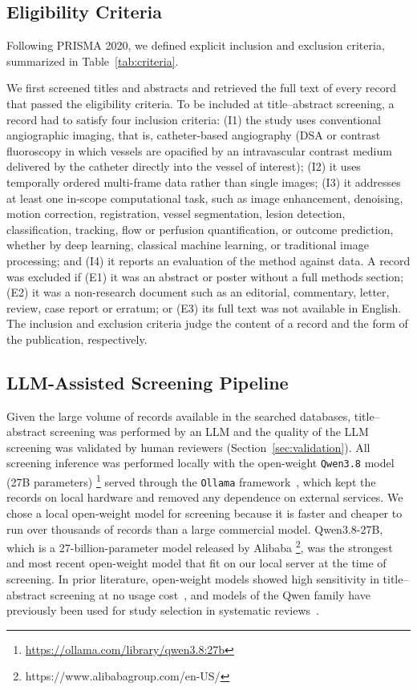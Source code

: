 \subsection{Eligibility Criteria}
\label{sec:eligibility}
Following PRISMA 2020, we defined explicit inclusion and exclusion criteria, summarized in Table~\ref{tab:criteria}. 


We first screened titles and abstracts and retrieved the full text of every record that passed the eligibility criteria. To be included at title--abstract screening, a record had to satisfy four inclusion criteria: (I1) the study uses conventional angiographic imaging, that is, catheter-based angiography (DSA or contrast fluoroscopy in which vessels are opacified by an intravascular contrast medium delivered by the catheter directly into the vessel of interest); (I2) it uses temporally ordered multi-frame data rather than single images; (I3) it addresses at least one in-scope computational task, such as image enhancement, denoising, motion correction, registration, vessel segmentation, lesion detection, classification, tracking, flow or perfusion quantification, or outcome prediction, whether by deep learning, classical machine learning, or traditional image processing; and (I4) it reports an evaluation of the method against data. A record was excluded if (E1) it was an abstract or poster without a full methods section; (E2) it was a non-research document such as an editorial, commentary, letter, review, case report or erratum; or (E3) its full text was not available in English. The inclusion and exclusion criteria judge the content of a record and the form of the publication, respectively.


\subsection{LLM-Assisted Screening Pipeline}
\label{sec:llm-pipeline}

Given the large volume of records available in the searched databases, title--abstract screening was performed by an LLM and the quality of the LLM screening was validated by human reviewers (Section~\ref{sec:validation}). All screening inference was performed locally with the open-weight \texttt{Qwen3.8} model (27B parameters) \footnote{\url{https://ollama.com/library/qwen3.8:27b}} served through the \texttt{Ollama} framework~\cite{marcondes2025using}, which kept the records on local hardware and removed any dependence on external services. We chose a local open-weight model for screening because it is faster and cheaper to run over thousands of records than a large commercial model. Qwen3.8-27B, which is a 27-billion-parameter model released by Alibaba \footnote{https://www.alibabagroup.com/en-US/}, was the strongest and most recent open-weight model that fit on our local server at the time of screening. In prior literature, open-weight models showed high sensitivity in title--abstract screening at no usage cost~\cite{sciurti2025compact}, and models of the Qwen family have previously been used for study selection in systematic reviews~\cite{looareesuwan2026study}.

